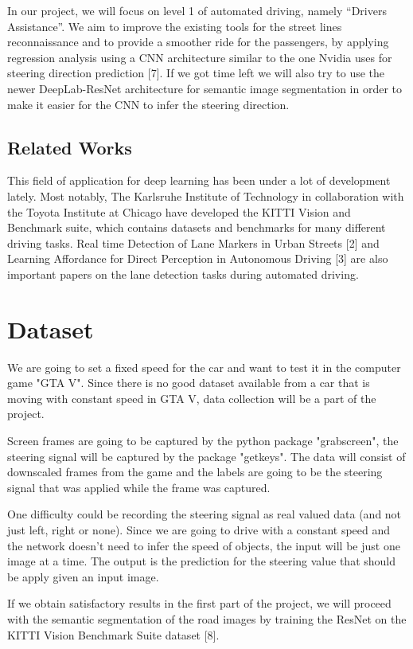 \documentclass[10pt,twocolumn,letterpaper]{article}
\begin{document}
	In our project, we will focus on level 1 of automated driving, namely “Drivers Assistance”. We aim to improve the existing tools for the street lines reconnaissance and to provide a smoother ride for the passengers, by applying regression analysis using a CNN architecture similar to the one Nvidia uses for steering direction prediction [7].  If we got time left we will also try to use the newer DeepLab-ResNet architecture for semantic image segmentation in order to make it easier for the CNN to infer the steering direction. 
	
	\subsection{Related Works}
	
	This field of application for deep learning has been under a lot of development lately. Most notably, The Karlsruhe Institute of Technology in collaboration with the Toyota Institute at Chicago have developed the KITTI Vision and Benchmark suite, which contains datasets and benchmarks for many different driving tasks. Real time Detection of Lane Markers in Urban Streets [2] and Learning Affordance for Direct Perception in Autonomous Driving [3] are also important papers on the lane detection tasks during automated driving.
	
	\section{Dataset}
	We are going to set a fixed speed for the car and want to test it in the computer game "GTA V". Since there is no good dataset available from a car that is moving with constant speed in GTA V, data collection will be a part of the project.  
	
	Screen frames are going to be captured by the python package "grabscreen", the steering signal will be captured by the package "getkeys". The data will consist of downscaled frames from the game and the labels are going to be the steering signal that was applied while the frame was captured.
	
	One difficulty could be recording the steering signal as real valued data (and not just left, right or none). Since we are going to drive with a constant speed and the network doesn't need to infer the speed of objects, the input will be just one image at a time. The output is the prediction for the steering value that should be apply given an input image.
	
	If we obtain satisfactory results in the first part of the project, we will proceed with the semantic segmentation of the road images by training the ResNet on the KITTI Vision Benchmark Suite dataset [8].
	
\end{document}
